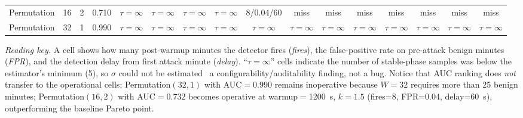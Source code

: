 \begin{table}[t]
{\begin{tabular}{lccc|cccc|cccc|cccc|}
Permutation & 16 & 2 & 0.710 & $\tau{=}\infty$ & $\tau{=}\infty$ & $\tau{=}\infty$ & $\tau{=}\infty$ & 8/0.04/60 & miss & miss & miss & miss & miss & miss & miss \\
Permutation & 32 & 1 & 0.990 & $\tau{=}\infty$ & $\tau{=}\infty$ & $\tau{=}\infty$ & $\tau{=}\infty$ & $\tau{=}\infty$ & $\tau{=}\infty$ & $\tau{=}\infty$ & $\tau{=}\infty$ & $\tau{=}\infty$ & $\tau{=}\infty$ & $\tau{=}\infty$ & $\tau{=}\infty$ \\
\bottomrule
\end{tabular}}
\vspace{2pt}
\begin{minipage}{\textwidth}\footnotesize
\emph{Reading key.} A cell shows how many post-warmup minutes the detector fires (\emph{fires}), the false-positive rate on pre-attack benign minutes (\emph{FPR}), and the detection delay from first attack minute (\emph{delay}). ``$\tau{=}\infty$'' cells indicate the number of stable-phase samples was below the estimator's minimum (5), so $\sigma$ could not be estimated \textemdash\ a configurability/auditability finding, not a bug. Notice that AUC ranking does \emph{not} transfer to the operational cells: Permutation$(32,1)$ with AUC$=0.990$ remains inoperative because $W=32$ requires more than 25 benign minutes; Permutation$(16,2)$ with AUC$=0.732$ becomes operative at warmup$=$1200~s, $k=1.5$ (fires=8, FPR=0.04, delay=60~s), outperforming the baseline Pareto point.
\end{minipage}
\end{table}
